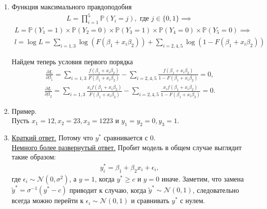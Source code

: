 \documentclass[12pt, a4paper]{article}
\begin{document}
\begin{enumerate}

\item Функция максимального правдоподобия
\begin{eqnarray}
L = \prod_{i=1}^5 \mathbb{P}(Y_i = j), \text{ где } j \in \{0,1\} \implies
\end{eqnarray}
\begin{eqnarray}
L = \mathbb{P}(Y_1 = 1) \times \mathbb{P}(Y_2 = 0) \times \mathbb{P}(Y_3 = 1) \times \mathbb{P}(Y_4 = 0) \times \mathbb{P}(Y_5 = 0) \implies
\end{eqnarray}
\begin{eqnarray}
l = \log L = \sum_{i=1,3} \log(F(\beta_1 + x_i \beta_2)) + \sum_{i = 2,4,5} \log(1 - F(\beta_1 + x_i \beta_2))
\end{eqnarray}

Найдем теперь условия первого порядка
\begin{eqnarray}
\frac {\partial L}{\partial \beta_1} = \sum_{i=1,3} \frac{f(\beta_1 + x_i\beta_2)}{F(\beta_1 + x_i \beta_2)} - \sum_{i=2,4,5} \frac { f(\beta_1 + x_i\beta_2)}{1 - F(\beta_1 + x_i \beta_2)} = 0,
\end{eqnarray}
\begin{eqnarray}
\frac {\partial L}{\partial \beta_2} = \sum_{i=1,3} \frac{x_i f(\beta_1 + x_i\beta_2)}{F(\beta_1 + x_i \beta_2)} - \sum_{i=2,4,5} \frac {x_i f(\beta_1 + x_i\beta_2)}{1 - F(\beta_1 + x_i \beta_2)} = 0.
\end{eqnarray}

\item
Пример. \\
Пусть $x_1 = 12, x_2 = 23, x_3 = 1223$ и $y_1 = y_2 = 0, y_3 = 1$.

\item
\underline{Краткий ответ.} Потому что $y^*$ сравнивается с 0. \\
\underline{Немного более развернутый ответ.} Пробит модель в общем случае выглядит такие образом:
\begin{eqnarray}
y^*_i = \beta_1 + \beta_2 x_i + \epsilon_i,
\end{eqnarray}
где $\epsilon_i \sim \mathcal{N}(0, \sigma^2)$, а $y = 1$, когда $y^* \ge c$ и $y = 0$ иначе. Заметим, что замена $\tilde y^* = \sigma^{-1} (y^* - c)$ приводит к случаю, когда $\tilde y^* \sim \mathcal{N}(0, 1)$, следовательно всегда можно перейти к $\epsilon_i \sim \mathcal{N}(0, 1)$ и сравнивать $y^*$ с нулем.


\end{enumerate}
\end{document}
